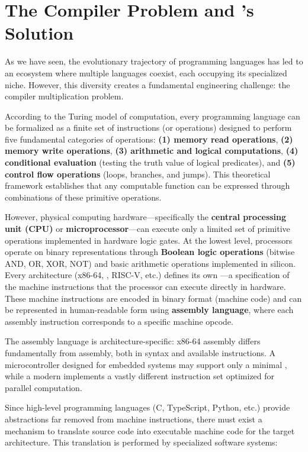 \section{The Compiler Problem and 's Solution}

As we have seen, the evolutionary trajectory of programming languages has led to an ecosystem where multiple languages coexist, each occupying its specialized niche. However, this diversity creates a fundamental engineering challenge: the compiler multiplication problem.

According to the Turing model of computation, every programming language can be formalized as a finite set of instructions (or operations) designed to perform five fundamental categories of operations: \textbf{(1) memory read operations}, \textbf{(2) memory write operations}, \textbf{(3) arithmetic and logical computations}, \textbf{(4) conditional evaluation} (testing the truth value of logical predicates), and \textbf{(5) control flow operations} (loops, branches, and jumps). This theoretical framework establishes that any computable function can be expressed through combinations of these primitive operations.

However, physical computing hardware—specifically the \textbf{central processing unit (CPU)} or \textbf{microprocessor}—can execute only a limited set of primitive operations implemented in hardware logic gates. At the lowest level, processors operate on binary representations through \textbf{Boolean logic operations} (bitwise AND, OR, XOR, NOT) and basic arithmetic operations implemented in silicon. Every  architecture (x86-64, , RISC-V, etc.) defines its own \textbf{}—a specification of the machine instructions that the processor can execute directly in hardware. These machine instructions are encoded in binary format (machine code) and can be represented in human-readable form using \textbf{assembly language}, where each assembly instruction corresponds to a specific machine opcode.

The assembly language is architecture-specific: x86-64 assembly differs fundamentally from  assembly, both in syntax and available instructions. A microcontroller designed for embedded systems may support only a minimal , while a modern  implements a vastly different instruction set optimized for parallel computation.

Since high-level programming languages (C, TypeScript, Python, etc.) provide abstractions far removed from machine instructions, there must exist a mechanism to translate source code into executable machine code for the target architecture. This translation is performed by specialized software systems:

